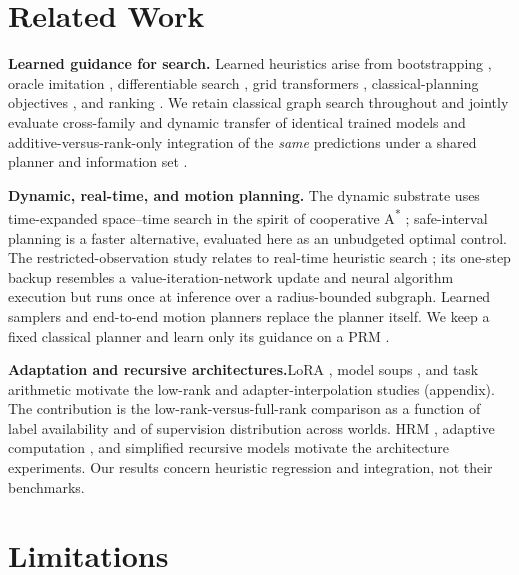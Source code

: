 \documentclass[letterpaper]{article} %
\begin{document}
\section{Related Work}

\textbf{Learned guidance for search.} Learned heuristics arise from bootstrapping \citep{arfaee2011bootstrap}, oracle imitation \citep{bhardwaj2017sail}, differentiable search \citep{yonetani2021neuralastar}, grid transformers \citep{kirilenko2023transpath}, classical-planning objectives \citep{ferber2020neural}, and ranking \citep{chrestien2023rank}. We retain classical graph search throughout and jointly evaluate cross-family and dynamic transfer of identical trained models and additive-versus-rank-only integration of the \emph{same} predictions under a shared planner and information set \citep{pohl1970,pearl1982semiadmissible,aine2016mha}.

\textbf{Dynamic, real-time, and motion planning.} The dynamic substrate uses time-expanded space--time search in the spirit of cooperative A\textsuperscript{*} \citep{silver2005cooperative}; safe-interval planning \citep{phillips2011sipp} is a faster alternative, evaluated here as an unbudgeted optimal control. The restricted-observation study relates to real-time heuristic search \citep{korf1990rta,koenig2006rtaa}; its one-step backup resembles a value-iteration-network update \citep{tamar2016vin,lee2018gppn} and neural algorithm execution \citep{velickovic2021nar} but runs once at inference over a radius-bounded subgraph. Learned samplers and end-to-end motion planners \citep{ichter2018sampling,qureshi2019mpnet} replace the planner itself. We keep a fixed classical planner and learn only its guidance on a PRM \citep{kavraki1996prm}.

\textbf{Adaptation and recursive architectures.}\hspace{0.25em}LoRA \citep{hu2021lora}, model soups \citep{wortsman2022soups}, and task arithmetic \citep{ilharco2022task} motivate the low-rank and adapter-interpolation studies (appendix). The contribution is the low-rank-versus-full-rank comparison as a function of label availability and of supervision distribution across worlds. HRM \citep{wang2025hrm}, adaptive computation \citep{graves2016act,banino2021pondernet}, and simplified recursive models \citep{jolicoeur2025trm} motivate the architecture experiments. Our results concern heuristic regression and integration, not their benchmarks.

\section{Limitations}
\end{document}
